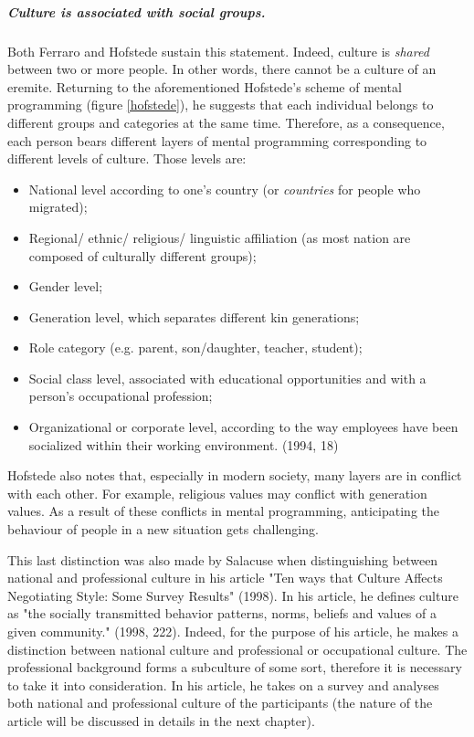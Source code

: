 \documentclass[../main.tex]{subfiles}
\begin{document}
\subparagraph*{Culture is associated with social groups.} Both Ferraro and Hofstede sustain this statement. Indeed, culture is \textit{shared} between two or more people. In other words, there cannot be a culture of an eremite. Returning to the aforementioned Hofstede's scheme of mental programming (figure \ref{hofstede}), he suggests that each individual belongs to different groups and categories at the same time. Therefore, as a consequence, each person bears different layers of mental programming corresponding to different levels of culture. Those levels are:
\begin{itemize}
\item National level according to one's country (or \textit{countries} for people who migrated);
\item Regional/ ethnic/ religious/ linguistic affiliation (as most nation are composed of culturally different groups);
\item Gender level;
\item Generation level, which separates different kin generations;
\item Role category (e.g. parent, son/daughter, teacher, student);
\item Social class level, associated with educational opportunities and with a person's occupational profession;
\item Organizational or corporate level, according to the way employees have been socialized within their working environment. (1994, 18)
\end{itemize}
Hofstede also notes that, especially in modern society, many layers are in conflict with each other. For example, religious values may conflict with generation values. As a result of these conflicts in mental programming, anticipating the behaviour of people in a new situation gets challenging.

This last distinction was also made by Salacuse %
when distinguishing between national and professional culture in his article "Ten ways that Culture Affects Negotiating Style: Some Survey Results" (1998)\cite{salacuse}. In his article, he defines culture as "the socially transmitted behavior patterns, norms, beliefs and values of a given community." (1998, 222). Indeed, for the purpose of his article, he makes a distinction between national culture and professional or occupational culture. The professional %
background forms a subculture of some sort, therefore it is necessary to take it into consideration. In his article, he takes on a survey and analyses both national and professional culture of the participants (the nature of the article will be discussed in details in the next chapter).
\end{document}
